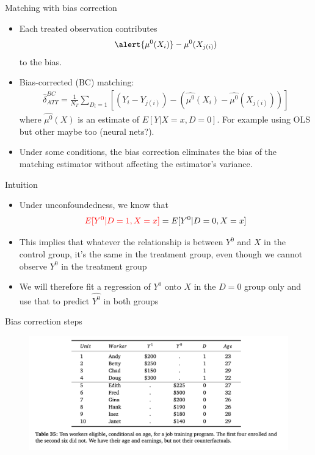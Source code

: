 \documentclass{beamer}
\begin{document}
 
\begin{frame}{Matching with bias correction}
	
	\begin{itemize}
	\item Each treated observation contributes$$\alert{\mu^0(X_i)} - \mu^0(X_{j(i)})$$to the bias.
	\item Bias-corrected (BC) matching:
		\begin{eqnarray*}
		\widehat{\delta}_{ATT}^{BC} = \frac{1}{N_T} \sum_{D_i=1} \left[ (Y_i - Y_{j(i)}) - ( \widehat{\mu^0}(X_i) - \widehat{\mu^0}(X_{j(i)}) ) \right]
		\end{eqnarray*}where $\widehat{\mu^0}(X)$ is an estimate of $E[Y|X=x,D=0]$.  For example using OLS but other maybe too (neural nets?).  
	\item Under some conditions, the bias correction eliminates the bias of the matching estimator without affecting the estimator's variance.
	\end{itemize}
\end{frame}

\begin{frame}{Intuition}

\begin{itemize}
\item Under unconfoundedness, we know that $$\textcolor{red}{E[Y^0|D=1, X=x]} = E[Y^0|D=0, X=x]$$
\item This implies that whatever the relationship is between $Y^0$ and $X$ in the control group, it's the same in the treatment group, even though we cannot observe $Y^0$ in the treatment group
\item We will therefore fit a regression of $Y^0$ onto $X$ in the $D=0$ group only and use that to predict $\widehat{Y^0}$ in both groups
\end{itemize}

\end{frame}

\begin{frame}{Bias correction steps}

\begin{figure}[!t]\centering
\includegraphics[scale=0.35]{./lecture_includes/nnmatch_bc1}
\end{figure}

\end{frame}
\end{document}
